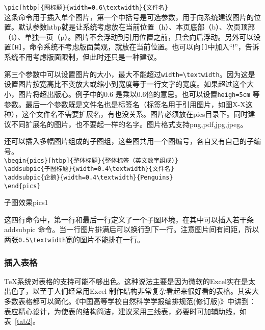 \verb|\pic[htbp]{图标题}{width=0.6\textwidth}{文件名}|\\
这条命令用于插入单个图片，第一个中括号是可选参数，用于向系统建议图片的位置。默认参数htbp就是让系统考虑放在当前位置（h）、本页底部（b）、次页顶部（t）、单独一页（p）。图片不会浮动到引用位置之前，只会向后浮动。另外可以设置\verb|[H]|，命令系统不考虑版面美观，就放在当前位置。也可以向\verb|[]|中加入“!”，告诉系统不用考虑版面限制，但此时还只是一种建议。

第三个参数中可以设置图片的大小，最大不能超过\verb|width=\textwidth|。因为这是设置图片按宽高比不变放大或缩小到宽度等于一行文字的宽度。如果超过这个大小，图片将超出版心。例子中的0.6 是乘以0.6倍的意思。也可以设置\verb|heigh=5cm| 等参数。最后一个参数既是文件名也是标签名（标签名用于引用图片，如图X-X这种），这个文件名不需要扩展名，有也没关系。图片必须放在pics目录下。同时建议不同扩展名的图片，也不要起一样的名字。图片格式支持png,pdf,jpg,jpeg。

还可以插入多幅图片组成的子图组，这些图共用一个图编号，各自又有自己的子编号。\\
\verb|\begin{pics}[htbp]{整体标题}{整体标签（英文数字组成）}|\\
\verb|\addsubpic{子图标题}{width=0.4\textwidth}{文件名}|\\
\verb|\addsubpic{企鹅}{width=0.4\textwidth}{Penguins}|\\
\verb|\end{pics}|\\
\begin{pics}[htbp]{子图效果}{pics1}
\end{pics}
这四行命令中，第一行和最后一行定义了一个子图环境，在其中可以插入若干条addsubpic 命令。当一行图片排满后可以换行到下一行。注意图片间有间距，所以两张\verb|0.5\textwidth|宽的图片不能排在一行。\par
\subsubsection{插入表格}
\TeX 系统对表格的支持可能不够出色。这种说法主要是因为微软的Excel实在是太出色了，以至于人们经常用Excel 制作结构非常复杂看起来很好看的表格。其实大多数表格都可以简化。《中国高等学校自然科学学报编排规范(修订版)》中讲到：表应精心设计，为使表的结构简洁，建议采用三线表，必要时可加辅助线，如表~\ref{tab2}。

